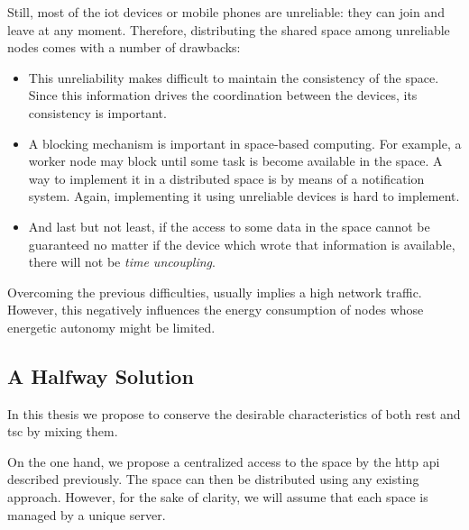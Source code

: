 Still, most of the \ac{iot} devices or mobile phones are unreliable: they can join and leave at any moment.
Therefore, distributing the shared space among unreliable nodes comes with a number of drawbacks:
\begin{itemize}
  \item This unreliability makes difficult to maintain the consistency of the space. %
        Since this information drives the coordination between the devices, its consistency is important.
  \item A blocking mechanism is important in space-based computing.
        For example, a worker node may block until some task is become available in the space.
        A way to implement it in a distributed space is by means of a notification system.
        Again, implementing it using unreliable devices is hard to implement. %
  \item And last but not least, if the access to some data in the space cannot be guaranteed no matter if the device which wrote that information is available, there will not be \emph{time uncoupling}.
\end{itemize}
Overcoming the previous difficulties, usually implies a high network traffic.
However, this negatively influences the energy consumption of nodes whose energetic autonomy might be limited.


\subsection{A Halfway Solution}
\label{sec:halfway_solution}

In this thesis we propose to conserve the desirable characteristics of both \ac{rest} and \ac{tsc} by mixing them.

On the one hand, we propose a centralized access to the space by the \acs{http} \ac{api} described previously.
The space can then be distributed using any existing approach. %
However, for the sake of clarity, we will assume that each space is managed by a unique server.

